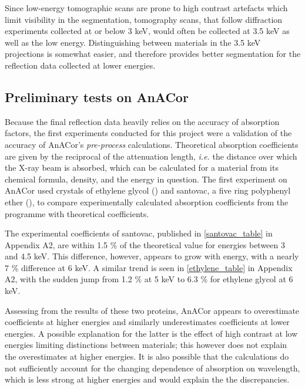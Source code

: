 Since low-energy tomographic scans are prone to high contrast artefacts which limit visibility in the segmentation, tomography scans, that follow diffraction experiments collected at or below 3 \unit{keV}, would often be collected at 3.5 \unit{keV} as well as the low energy. Distinguishing between materials in the 3.5 \unit{keV} projections is somewhat easier, and therefore provides better segmentation for the reflection data collected at lower energies.




\subsection{Preliminary tests on AnACor}

Because the final reflection data heavily relies on the accuracy of absorption factors, the first experiments conducted for this project were a validation of the accuracy of AnACor's \textit{pre-process} calculations. Theoretical absorption coefficients are given by the reciprocal of the attenuation length, \textit{i.e.}  the distance over which the X-ray beam is absorbed, which can be calculated for a material from its chemical formula, density, and the energy in question. The first experiment on AnACor used crystals of ethylene glycol () and santovac, a five ring polyphenyl ether (), to compare experimentally calculated absorption coefficients from the programme with theoretical coefficients.

The experimental coefficients of santovac, published in \cref{santovac_table} in Appendix A2, are within 1.5 \% of the theoretical value for energies between 3 and 4.5 \unit{keV}. This difference, however, appears to grow with energy, with a nearly 7 \% difference at 6 \unit{keV}. A similar trend is seen in \cref{ethylene_table} in Appendix A2, with the sudden jump from 1.2 \% at 5 \unit{keV} to 6.3 \% for ethylene glycol at 6 \unit{keV}.

Assessing from the results of these two proteins, AnACor appears to overestimate coefficients at higher energies and similarly underestimates coefficients at lower energies. A possible explanation for the latter is the effect of high contrast at low energies limiting distinctions between materials; this however does not explain the overestimates at higher energies. It is also possible that the calculations do not sufficiently account for the changing dependence of absorption on wavelength, which is less strong at higher energies and would explain the the discrepancies.

